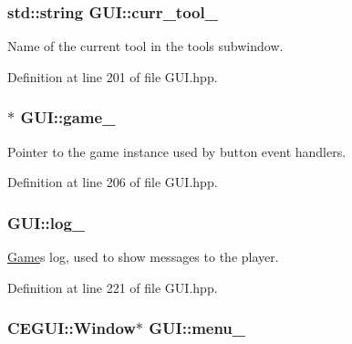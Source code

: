 \subsubsection[{\texorpdfstring{curr\+\_\+tool\+\_\+}{curr_tool_}}]{\setlength{\rightskip}{0pt plus 5cm}std\+::string G\+U\+I\+::curr\+\_\+tool\+\_\+\hspace{0.3cm}{\ttfamily [private]}}\hypertarget{class_g_u_i_a8ee9091320921548eca2305ec60d5182}{}\label{class_g_u_i_a8ee9091320921548eca2305ec60d5182}


Name of the current tool in the tools subwindow. 



Definition at line 201 of file G\+U\+I.\+hpp.

\subsubsection[{\texorpdfstring{game\+\_\+}{game_}}]{$\ast$ G\+U\+I\+::game\+\_\+\hspace{0.3cm}{\ttfamily [private]}}\hypertarget{class_g_u_i_a8af61511961fc5de258e1fd8e03eeed4}{}\label{class_g_u_i_a8af61511961fc5de258e1fd8e03eeed4}


Pointer to the game instance used by button event handlers. 



Definition at line 206 of file G\+U\+I.\+hpp.

\subsubsection[{\texorpdfstring{log\+\_\+}{log_}}]{ G\+U\+I\+::log\+\_\+\hspace{0.3cm}{\ttfamily [private]}}\hypertarget{class_g_u_i_a2290d6a10a481beaa55dd93913ceadaf}{}\label{class_g_u_i_a2290d6a10a481beaa55dd93913ceadaf}


\hyperlink{class_game}{Game}\textquotesingle{}s log, used to show messages to the player. 



Definition at line 221 of file G\+U\+I.\+hpp.

\subsubsection[{\texorpdfstring{menu\+\_\+}{menu_}}]{\setlength{\rightskip}{0pt plus 5cm}C\+E\+G\+U\+I\+::\+Window$\ast$ G\+U\+I\+::menu\+\_\+\hspace{0.3cm}{\ttfamily [private]}}\hypertarget{class_g_u_i_aa9a52eb5090edfa1e62773be5dd03da3}{}\label{class_g_u_i_aa9a52eb5090edfa1e62773be5dd03da3}


